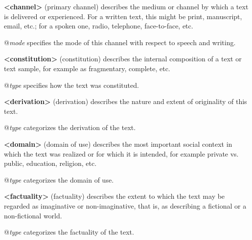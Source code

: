 \begin{sansreflist}
  
\item [\textbf{<channel>}] (primary channel) describes the medium or channel by which a text is delivered or experienced. For a written text, this might be print, manuscript, email, etc.; for a spoken one, radio, telephone, face-to-face, etc.\hfil\\[-10pt]\begin{sansreflist}
    \item[@{\itshape mode}]
  specifies the mode of this channel with respect to speech and writing.
\end{sansreflist}  
\item [\textbf{<constitution>}] (constitution) describes the internal composition of a text or text sample, for example as fragmentary, complete, etc.\hfil\\[-10pt]\begin{sansreflist}
    \item[@{\itshape type}]
  specifies how the text was constituted.
\end{sansreflist}  
\item [\textbf{<derivation>}] (derivation) describes the nature and extent of originality of this text.\hfil\\[-10pt]\begin{sansreflist}
    \item[@{\itshape type}]
  categorizes the derivation of the text.
\end{sansreflist}  
\item [\textbf{<domain>}] (domain of use) describes the most important social context in which the text was realized or for which it is intended, for example private vs. public, education, religion, etc.\hfil\\[-10pt]\begin{sansreflist}
    \item[@{\itshape type}]
  categorizes the domain of use.
\end{sansreflist}  
\item [\textbf{<factuality>}] (factuality) describes the extent to which the text may be regarded as imaginative or non-imaginative, that is, as describing a fictional or a non-fictional world.\hfil\\[-10pt]\begin{sansreflist}
    \item[@{\itshape type}]
  categorizes the factuality of the text.
\end{sansreflist}  

\end{sansreflist}
